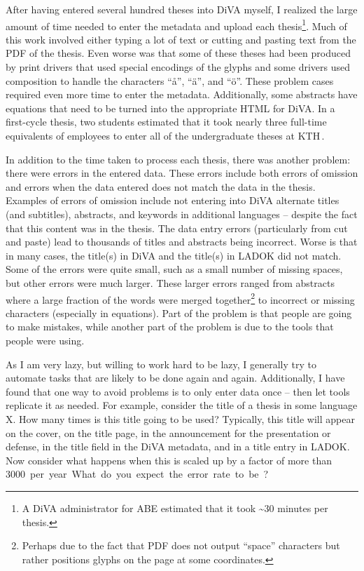 \documentclass[12pt, twoside]{article}
\begin{document}
After having entered several hundred theses into \gls{DiVA} myself, I realized the large amount of time needed to enter the metadata and upload each thesis\footnote{A DiVA administrator for ABE estimated that it took \textasciitilde 30 minutes per thesis.}. Much of this work involved either typing a lot of text or cutting and pasting text from the \gls{PDF} of the thesis. Even worse was that some of these theses had been produced by print drivers that used special encodings of the glyphs and some drivers used composition to handle the characters \enquote{å}, \enquote{ä}, and \enquote{ö}. These problem cases required even more time to enter the metadata. Additionally, some abstracts have equations that need to be turned into the appropriate HTML for \gls{DiVA}. In a first-cycle thesis, two students estimated that it took nearly three full-time equivalents of employees to enter all of the undergraduate theses at \gls{KTH}\,\cite{BesharatPour_and_Li_2019}.

In addition to the time taken to process each thesis, there was another problem: there were errors in the entered data. These errors include both errors of omission and errors when the data entered does not match the data in the thesis. Examples of errors of omission include not entering into \gls{DiVA} alternate titles (and subtitles), abstracts, and keywords in additional languages -- despite the fact that this content was in the thesis. The data entry errors (particularly from cut and paste) lead to thousands of titles and abstracts being incorrect. Worse is that in many cases, the title(s) in \gls{DiVA} and the title(s) in \gls{LADOK} did not match. Some of the errors were quite small, such as a small number of missing spaces, but other errors were much larger. These larger errors ranged from abstracts where a large fraction of the words were merged together\footnote{Perhaps due to the fact that \gls{PDF} does not output \enquote{space} characters but rather positions glyphs on the page at some coordinates.} to incorrect or missing characters (especially in equations). Part of the problem is that people are going to make mistakes, while another part of the problem is due to the tools that people were using.

As I am very lazy, but willing to work hard to be lazy, I generally try to automate tasks that are likely to be done again and again. Additionally, I have found that one way to avoid problems is to only enter data once -- then let tools replicate it as needed. For example, consider the title of a thesis in some language X. How many times is this title going to be used? Typically, this title will appear on the cover, on the title page, in the announcement for the presentation or defense, in the title field in the \gls{DiVA} metadata, and in a title entry in \gls{LADOK}. Now consider what happens when this is scaled up by a factor of more than \qty{3000} per year. What do you expect the error rate to be?
\end{document}
